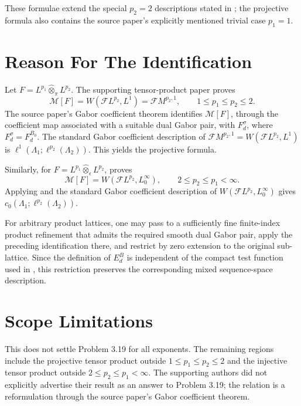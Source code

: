 \documentclass[11pt]{article}
\newcommand{\otpi}{\widehat{\otimes}_{\pi}}
\newcommand{\oteps}{\widehat{\otimes}_{\epsilon}}
\newcommand{\FL}{\mathcal{F}L}
\newcommand{\Mod}{\mathcal{M}}
\begin{document}
These formulae extend the special \(p_2=2\) descriptions stated in
\cite[Corollary 3.21]{DP2023}; the projective formula also contains the
source paper's explicitly mentioned trivial case \(p_1=1\).

\section*{Reason For The Identification}

Let \(F=L^{p_1}\otpi L^{p_2}\). The supporting tensor-product paper
\cite[Corollary 6.1(a) and Remark 6.2]{FPP2022} proves
\[
 \Mod[F] = W(\FL^{p_2},L^1)=\mathcal{F}M^{p_2,1},
 \qquad 1\leq p_1\leq p_2\leq 2.
\]
The source paper's Gabor coefficient theorem
\cite[Corollary 4.11]{DP2023} identifies \(\Mod[F]\), through the coefficient
map associated with a suitable dual Gabor pair, with \(F_d^{\sigma}\), where
\(F_d^{\sigma}=F_d^{B_0}\). The standard Gabor coefficient description of
\(\mathcal{F}M^{p_2,1}=W(\FL^{p_2},L^1)\) is
\(\ell^1(\Lambda_1;\ell^{p_2}(\Lambda_2))\). This yields the projective
formula.

Similarly, for \(F=L^{p_1}\oteps L^{p_2}\),
\cite[Corollary 6.1(b)]{FPP2022} proves
\[
 \Mod[F] = W(\FL^{p_2},L^\infty_0),
 \qquad 2\leq p_2\leq p_1<\infty.
\]
Applying \cite[Corollary 4.11]{DP2023} and the standard Gabor coefficient
description of \(W(\FL^{p_2},L^\infty_0)\) gives
\(c_0(\Lambda_1;\ell^{p_2}(\Lambda_2))\).

For arbitrary product lattices, one may pass to a sufficiently fine finite-index
product refinement that admits the required smooth dual Gabor pair, apply the
preceding identification there, and restrict by zero extension to the original
sub-lattice. Since the definition of \(E_d^B\) is independent of the compact
test function used in \cite[Theorem 3.1]{DP2023}, this restriction preserves
the corresponding mixed sequence-space description.

\section*{Scope Limitations}

This does not settle Problem 3.19 for all exponents. The remaining regions
include the projective tensor product outside \(1\leq p_1\leq p_2\leq 2\) and
the injective tensor product outside \(2\leq p_2\leq p_1<\infty\). The
supporting authors did not explicitly advertise their result as an answer to
Problem 3.19; the relation is a reformulation through the source paper's Gabor
coefficient theorem.
\end{document}
